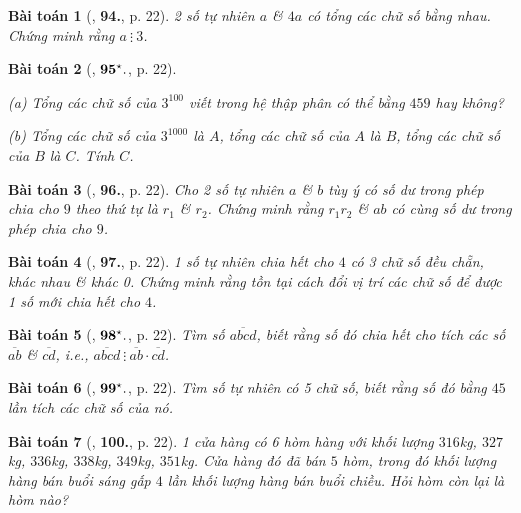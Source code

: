 \documentclass{article}
\numberwithin{equation}{section}
\newtheorem{baitoan}{Bài toán}[section]
\begin{document}
\begin{baitoan}[\cite{Binh_Toan_6_tap_1}, \textbf{94.}, p. 22]
	2 số tự nhiên $a$ \& $4a$ có tổng các chữ số bằng nhau. Chứng minh rằng $a\ \vdots\ 3$.
\end{baitoan}

\begin{baitoan}[\cite{Binh_Toan_6_tap_1}, $\bf 95^\star.$, p. 22]
	\begin{enumerate*}
		\item[(a)] Tổng các chữ số của $3^{100}$ viết trong hệ thập phân có thể bằng $459$ hay không?
		\item[(b)] Tổng các chữ số của $3^{1000}$ là $A$, tổng các chữ số của $A$ là $B$, tổng các chữ số của $B$ là $C$. Tính $C$.
	\end{enumerate*}
\end{baitoan}

\begin{baitoan}[\cite{Binh_Toan_6_tap_1}, \textbf{96.}, p. 22]
	Cho 2 số tự nhiên $a$ \& $b$ tùy ý có số dư trong phép chia cho $9$ theo thứ tự là $r_1$ \& $r_2$. Chứng minh rằng $r_1r_2$ \& $ab$ có cùng số dư trong phép chia cho $9$.
\end{baitoan}

\begin{baitoan}[\cite{Binh_Toan_6_tap_1}, \textbf{97.}, p. 22]
	1 số tự nhiên chia hết cho $4$ có 3 chữ số đều chẵn, khác nhau \& khác 0. Chứng minh rằng tồn tại cách đổi vị trí các chữ số để được 1 số mới chia hết cho $4$.
\end{baitoan}

\begin{baitoan}[\cite{Binh_Toan_6_tap_1}, $\bf 98^\star.$, p. 22]
	Tìm số $\overline{abcd}$, biết rằng số đó chia hết cho tích các số $\overline{ab}$ \& $\overline{cd}$, i.e., $\overline{abcd}\ \vdots\ \overline{ab}\cdot\overline{cd}$.
\end{baitoan}

\begin{baitoan}[\cite{Binh_Toan_6_tap_1}, $\bf 99^\star.$, p. 22]
	Tìm số tự nhiên có 5 chữ số, biết rằng số đó bằng $45$ lần tích các chữ số của nó.
\end{baitoan}	

\begin{baitoan}[\cite{Binh_Toan_6_tap_1}, \textbf{100.}, p. 22]
	1 cửa hàng có 6 hòm hàng với khối lượng $316$kg, $327$kg, $336$kg, $338$kg, $349$kg, $351$kg. Cửa hàng đó đã bán $5$ hòm, trong đó khối lượng hàng bán buổi sáng gấp $4$ lần khối lượng hàng bán buổi chiều. Hỏi hòm còn lại là hòm nào?
\end{baitoan}
\end{document}
